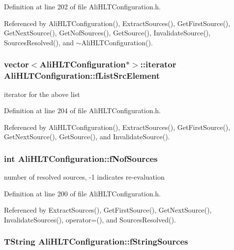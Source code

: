Definition at line 202 of file Ali\-HLTConfiguration.h.

Referenced by Ali\-HLTConfiguration(), Extract\-Sources(), Get\-First\-Source(), Get\-Next\-Source(), Get\-Nof\-Sources(), Get\-Source(), Invalidate\-Source(), Sources\-Resolved(), and $\sim$Ali\-HLTConfiguration().
\subsubsection{\setlength{\rightskip}{0pt plus 5cm}vector$<${\bf Ali\-HLTConfiguration}$\ast$$>$::iterator {\bf Ali\-HLTConfiguration::f\-List\-Src\-Element}\hspace{0.3cm}{\tt  [private]}}\label{classAliHLTConfiguration_r5}


iterator for the above list 

Definition at line 204 of file Ali\-HLTConfiguration.h.

Referenced by Ali\-HLTConfiguration(), Extract\-Sources(), Get\-First\-Source(), Get\-Next\-Source(), Get\-Source(), and Invalidate\-Source().
\subsubsection{\setlength{\rightskip}{0pt plus 5cm}int {\bf Ali\-HLTConfiguration::f\-Nof\-Sources}\hspace{0.3cm}{\tt  [private]}}\label{classAliHLTConfiguration_r3}


number of resolved sources, -1 indicates re-evaluation 

Definition at line 200 of file Ali\-HLTConfiguration.h.

Referenced by Extract\-Sources(), Get\-First\-Source(), Get\-Next\-Source(), Invalidate\-Sources(), operator=(), and Sources\-Resolved().
\subsubsection{\setlength{\rightskip}{0pt plus 5cm}TString {\bf Ali\-HLTConfiguration::f\-String\-Sources}\hspace{0.3cm}{\tt  [private]}}\label{classAliHLTConfiguration_r2}


